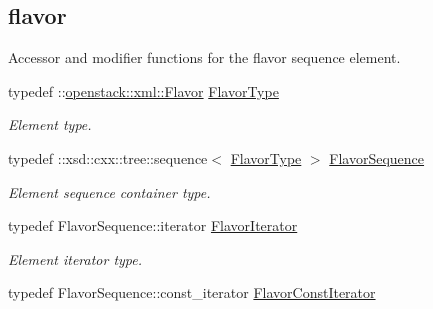 \subsection*{flavor}
\label{_amgrp7b963e485a0c31a9632b5b2ec4fc022d}
Accessor and modifier functions for the flavor sequence element. \begin{DoxyCompactItemize}
\item 
\hypertarget{classopenstack_1_1xml_1_1Flavors_acf63431cbb6515448dbafecb2cf51859}{
typedef ::\hyperlink{classopenstack_1_1xml_1_1Flavor}{openstack::xml::Flavor} \hyperlink{classopenstack_1_1xml_1_1Flavors_acf63431cbb6515448dbafecb2cf51859}{FlavorType}}
\label{classopenstack_1_1xml_1_1Flavors_acf63431cbb6515448dbafecb2cf51859}

\begin{DoxyCompactList}\small\item\em Element type. \item\end{DoxyCompactList}\item 
\hypertarget{classopenstack_1_1xml_1_1Flavors_a6dcb5da00dc0310b0bae660aa5d40409}{
typedef ::xsd::cxx::tree::sequence$<$ \hyperlink{classopenstack_1_1xml_1_1Flavor}{FlavorType} $>$ \hyperlink{classopenstack_1_1xml_1_1Flavors_a6dcb5da00dc0310b0bae660aa5d40409}{FlavorSequence}}
\label{classopenstack_1_1xml_1_1Flavors_a6dcb5da00dc0310b0bae660aa5d40409}

\begin{DoxyCompactList}\small\item\em Element sequence container type. \item\end{DoxyCompactList}\item 
\hypertarget{classopenstack_1_1xml_1_1Flavors_ad7a8deae314ce044cb8b8dac0a1aed61}{
typedef FlavorSequence::iterator \hyperlink{classopenstack_1_1xml_1_1Flavors_ad7a8deae314ce044cb8b8dac0a1aed61}{FlavorIterator}}
\label{classopenstack_1_1xml_1_1Flavors_ad7a8deae314ce044cb8b8dac0a1aed61}

\begin{DoxyCompactList}\small\item\em Element iterator type. \item\end{DoxyCompactList}\item 
\hypertarget{classopenstack_1_1xml_1_1Flavors_ace535cead9cd51048d35a4cb6550aeff}{
typedef FlavorSequence::const\_\-iterator \hyperlink{classopenstack_1_1xml_1_1Flavors_ace535cead9cd51048d35a4cb6550aeff}{FlavorConstIterator}}
\label{classopenstack_1_1xml_1_1Flavors_ace535cead9cd51048d35a4cb6550aeff}


\end{DoxyCompactItemize}
